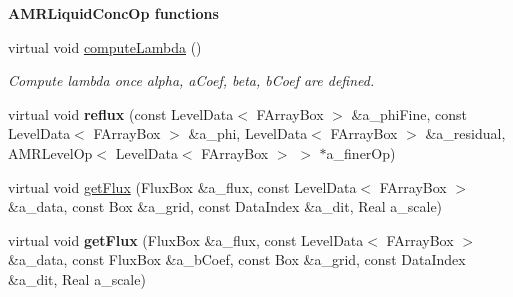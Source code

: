 \begin{Indent}{\bf A\-M\-R\-Liquid\-Conc\-Op functions}
\begin{DoxyCompactItemize}
\item 
\hypertarget{class_a_m_r_liquid_conc_op_a4a5de1d131c2791b3d55fe9a49e80c42}{virtual void \hyperlink{class_a_m_r_liquid_conc_op_a4a5de1d131c2791b3d55fe9a49e80c42}{compute\-Lambda} ()}\label{class_a_m_r_liquid_conc_op_a4a5de1d131c2791b3d55fe9a49e80c42}

\begin{DoxyCompactList}\small\item\em Compute lambda once alpha, a\-Coef, beta, b\-Coef are defined. \end{DoxyCompactList}\item 
\hypertarget{class_a_m_r_liquid_conc_op_a354c6a11d030c5263895e5b8c9a3d1c2}{virtual void {\bfseries reflux} (const Level\-Data$<$ F\-Array\-Box $>$ \&a\-\_\-phi\-Fine, const Level\-Data$<$ F\-Array\-Box $>$ \&a\-\_\-phi, Level\-Data$<$ F\-Array\-Box $>$ \&a\-\_\-residual, A\-M\-R\-Level\-Op$<$ Level\-Data$<$ F\-Array\-Box $>$ $>$ $\ast$a\-\_\-finer\-Op)}\label{class_a_m_r_liquid_conc_op_a354c6a11d030c5263895e5b8c9a3d1c2}

\item 
virtual void \hyperlink{class_a_m_r_liquid_conc_op_ab2dcc86e6954e6a2b65b035082aeea93}{get\-Flux} (Flux\-Box \&a\-\_\-flux, const Level\-Data$<$ F\-Array\-Box $>$ \&a\-\_\-data, const Box \&a\-\_\-grid, const Data\-Index \&a\-\_\-dit, Real a\-\_\-scale)
\item 
\hypertarget{class_a_m_r_liquid_conc_op_a826f104df44a073e6604cdd2b9658841}{virtual void {\bfseries get\-Flux} (Flux\-Box \&a\-\_\-flux, const Level\-Data$<$ F\-Array\-Box $>$ \&a\-\_\-data, const Flux\-Box \&a\-\_\-b\-Coef, const Box \&a\-\_\-grid, const Data\-Index \&a\-\_\-dit, Real a\-\_\-scale)}\label{class_a_m_r_liquid_conc_op_a826f104df44a073e6604cdd2b9658841}

\end{DoxyCompactItemize}
\end{Indent}
